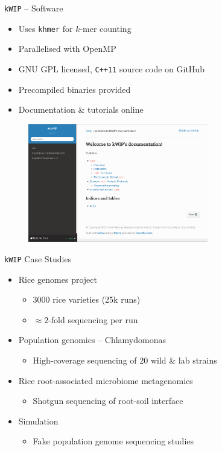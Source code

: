 \documentclass[t]{beamer}
\begin{document}
\begin{frame}{\texttt{kWIP} -- Software}
  \begin{itemize}
    \item Uses \texttt{khmer} for $k$-mer counting
    \item Parallelised with OpenMP
    \item GNU GPL licensed, \texttt{C++11} source code on GitHub
    \item Precompiled binaries provided
    \item Documentation \& tutorials online
  \end{itemize}
  \begin{figure}
    \centering
    \includegraphics[width=0.7\textwidth]{img/kwip-doc-screenshot.png}
  \end{figure}
\end{frame}

\begin{frame}{\texttt{kWIP} Case Studies}
  \begin{itemize}
    \item Rice genomes project
        \autocite{the_3000_rice_genomes_project_3000_2014}
      \begin{itemize}
        \item 3000 rice varieties (25k runs)
        \item $\approx 2$-fold sequencing per run
      \end{itemize}
    \item Population genomics -- Chlamydomonas \autocite{flowers_whole-genome_2015}
      \begin{itemize}
        \item High-coverage sequencing of 20 wild \& lab strains
      \end{itemize}
    \item Rice root-associated microbiome metagenomics
      \begin{itemize}
        \item Shotgun sequencing of root-soil interface
      \end{itemize}
    \item Simulation
      \begin{itemize}
        \item Fake population genome sequencing studies
      \end{itemize}
  \end{itemize}
\end{frame}
\end{document}

